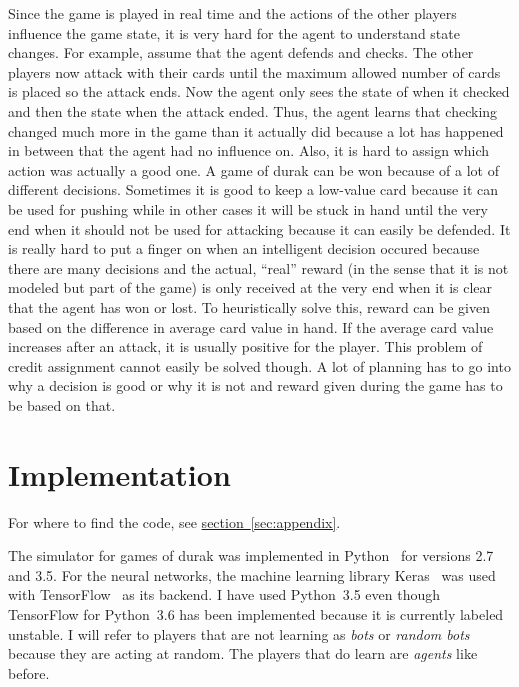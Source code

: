 \documentclass[a4paper,titlepage]{article}
\begin{document}
Since the game is played in real time and the actions of the other players influence the game state, it is very hard for the agent to understand state changes. For example, assume that the agent defends and checks. The other players now attack with their cards until the maximum allowed number of cards is placed so the attack ends. Now the agent only sees the state of when it checked and then the state when the attack ended. Thus, the agent learns that checking changed much more in the game than it actually did because a lot has happened in between that the agent had no influence on. Also, it is hard to assign which action was actually a good one. A game of durak can be won because of a lot of different decisions. Sometimes it is good to keep a low-value card because it can be used for pushing while in other cases it will be stuck in hand until the very end when it should not be used for attacking because it can easily be defended. It is really hard to put a finger on when an intelligent decision occured because there are many decisions and the actual, ``real'' reward (in the sense that it is not modeled but part of the game) is only received at the very end when it is clear that the agent has won or lost. To heuristically solve this, reward can be given based on the difference in average card value in hand. If the average card value increases after an attack, it is usually positive for the player. This problem of credit assignment cannot easily be solved though. A lot of planning has to go into why a decision is good or why it is not and reward given during the game has to be based on that.

\newpage

\section{Implementation}

For where to find the code, see \hyperref[sec:appendix]{section~\ref*{sec:appendix}}.

The simulator for games of durak was implemented in Python~\cite{python} for versions 2.7 and 3.5. For the neural networks, the machine learning library Keras~\cite{keras} was used with {TensorFlow}~\cite{tensorflow}  as its backend. I have used Python~3.5 even though TensorFlow for Python~3.6 has been implemented because it is currently labeled unstable. I will refer to players that are not learning as \emph{bots} or \emph{random bots} because they are acting at random. The players that do learn are \emph{agents} like before.
\end{document}
